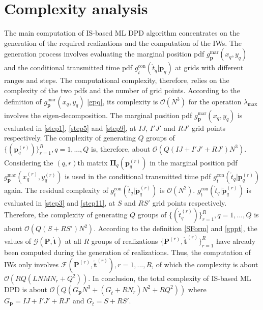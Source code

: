 \documentclass[review]{elsarticle}
\begin{document}
\section{Complexity analysis}
The main computation of IS-based ML DPD algorithm concentrates on the generation of the required realizations and the computation of the IWs. The generation process involves evaluating the marginal position pdf $g_{\boldsymbol{p}}^{\text{mar}}(x_q,y_q)$ and the conditional transmitted time pdf $g_{\mathring{t}}^{\text{con}}(\mathring{t}_q \vert \boldsymbol{p}_q)$ at grids with different ranges and steps. The computational complexity, therefore, relies on the complexity of the two pdfs and the number of grid points. According to the definition of $g_{\boldsymbol{p}}^{\text{mar}}(x_q,y_q)$ \eqref{gpq}, its complexity is $\mathcal{O}(N^3)$ for the operation $\lambda_{\text{max}}$ involves the eigen-decomposition. The marginal position pdf $g_{\boldsymbol{p}}^{\text{mar}}(x_q,y_q)$ is evaluated in \eqref{step1}, \eqref{step5} and \eqref{step9}, at  $IJ$, $I'J'$ and $RJ'$ grid points respectively. The complexity of generating $Q$ groups of $\lbrace(\boldsymbol{p}_q^{(r)})\rbrace_{r=1}^{R},q=1,...,Q$ is, therefore, about $\mathcal{O}(Q(IJ+I'J'+RJ')N^3)$. Considering the $(q,r)$th matrix $\boldsymbol{\Pi}_q(\boldsymbol{p}_q^{(r)})$ in the marginal position pdf $g_{\boldsymbol{p}}^{\text{mar}}(x_q^{(r)},y_q^{(r)})$ is used in the conditional transmitted time pdf $g_{\mathring{t}}^{\text{con}}(\mathring{t}_q \vert \boldsymbol{p}_q^{(r)})$ again. The residual complexity of $g_{\mathring{t}}^{\text{con}}(\mathring{t}_q \vert \mathring{\boldsymbol{p}}_q^{(r)})$ is $\mathcal{O}(N^2)$. $g_{\mathring{t}}^{\text{con}}(\mathring{t}_q \vert \mathring{\boldsymbol{p}}_q^{(r)})$ is evaluated in \eqref{step3} and \eqref{step11}, at $S$ and $RS'$ grid points respectively. Therefore, the complexity of generating $Q$ groups of $\lbrace(\mathring{t}_q^{(r)})\rbrace_{r=1}^{R},q=1,...,Q$ is about $\mathcal{O}(Q(S+RS')N^2)$. According to the definition \eqref{SForm} and \eqref{gppt}, the values of $ \mathcal{G}(\boldsymbol{P},\mathring{\boldsymbol{t}})$ at all $R$ groups of realizations $\lbrace \boldsymbol{P}^{(r)},\mathring{\boldsymbol{t}}^{(r)}\rbrace_{r=1}^R$ have already been computed during the generation of realizations. Thus, the computation of IWs only involves $\mathcal{F}(\boldsymbol{P}^{(r)},\mathring{\boldsymbol{t}}^{(r)}),r=1,...,R$, of which the complexity is about $\mathcal{O}(RQ(LNMN_r+Q^2))$. In conclusion, the total complexity of IS-based ML DPD is about $\mathcal{O}(Q(G_{\boldsymbol{p}}N^3+(G_{\mathring{t}}+RN_r)N^2+RQ^2))$ where $G_{\boldsymbol{p}}=IJ+I'J'+RJ'$ and $G_{\mathring{t}}=S+RS'$.
\end{document}
